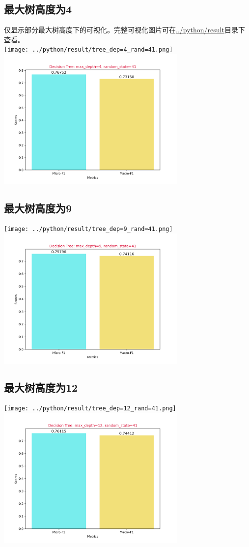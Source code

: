 \documentclass{article}
\begin{document}
\subsection{最大树高度为4}
仅显示部分最大树高度下的可视化。完整可视化图片可在\href{'../python/result/'}{../python/result}目录下查看。\\
\texttt{[image: ../python/result/tree\_dep=4\_rand=41.png]}\\
\includegraphics[width=0.7\textwidth]{../python/result/score_dep=4_rand=41.png}\\
\subsection{最大树高度为9}
\texttt{[image: ../python/result/tree\_dep=9\_rand=41.png]}\\
\includegraphics[width=0.7\textwidth]{../python/result/score_dep=9_rand=41.png}\\
\subsection{最大树高度为12}
\texttt{[image: ../python/result/tree\_dep=12\_rand=41.png]}\\
\includegraphics[width=0.7\textwidth]{../python/result/score_dep=12_rand=41.png}\\
\end{document}
